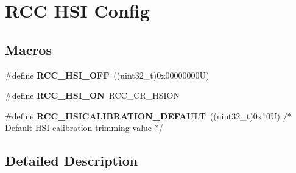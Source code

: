 \hypertarget{group___r_c_c___h_s_i___config}{}\section{R\+CC H\+SI Config}
\label{group___r_c_c___h_s_i___config}
\subsection*{Macros}
\begin{DoxyCompactItemize}
\item 
\mbox{\label{group___r_c_c___h_s_i___config_ga1b34d37d3b51afec0758b3ddc7a7e665}} 
\#define {\bfseries R\+C\+C\+\_\+\+H\+S\+I\+\_\+\+O\+FF}~((uint32\+\_\+t)0x00000000\+U)
\item 
\mbox{\label{group___r_c_c___h_s_i___config_ga0bf09ef9e46d5da25cced7b3122f92f5}} 
\#define {\bfseries R\+C\+C\+\_\+\+H\+S\+I\+\_\+\+ON}~R\+C\+C\+\_\+\+C\+R\+\_\+\+H\+S\+I\+ON
\item 
\mbox{\label{group___r_c_c___h_s_i___config_ga03cf582e263fb7e31a7783d8adabd7a0}} 
\#define {\bfseries R\+C\+C\+\_\+\+H\+S\+I\+C\+A\+L\+I\+B\+R\+A\+T\+I\+O\+N\+\_\+\+D\+E\+F\+A\+U\+LT}~((uint32\+\_\+t)0x10\+U)         /$\ast$ Default H\+S\+I calibration trimming value $\ast$/
\end{DoxyCompactItemize}


\subsection{Detailed Description}
